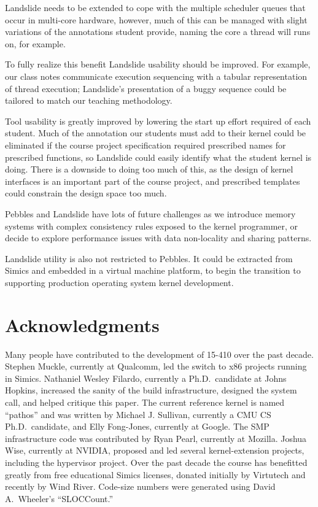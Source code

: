 Landslide needs to be extended to cope with the multiple scheduler queues that occur in multi-core hardware, however, much of this can be managed with slight variations of the annotations student provide, naming the core a thread will runs on, for example.

To fully realize this benefit Landslide usability should be improved.
For example, our class notes communicate execution sequencing with a tabular representation of thread execution; Landslide's presentation of a buggy sequence could be tailored to match our teaching methodology.

Tool usability is greatly improved by lowering the start up effort required of each student.
Much of the annotation our students must add to their kernel could be eliminated if the course project specification required prescribed names for prescribed functions, so Landslide could easily identify what the student kernel is doing.
There is a downside to doing too much of this, as the design of kernel interfaces is an important part of the course project, and prescribed templates could constrain the design space too much.

Pebbles and Landslide have lots of future challenges as we introduce memory systems with complex consistency rules exposed to the kernel programmer, or decide to explore performance issues with data non-locality and sharing patterns.

Landslide utility is also not restricted to Pebbles.
It could be extracted from Simics and embedded in a virtual machine platform, to begin the transition to supporting production operating system kernel development.


\section*{Acknowledgments}

Many people have contributed to the development of
15-410 over the past decade.
Stephen Muckle, currently at Qualcomm, led
the switch to x86 projects running in Simics.
Nathaniel Wesley Filardo,
currently a Ph.D.\ candidate at Johns Hopkins,
increased the sanity of the build infrastructure,
designed the  system call, and helped critique this paper.
The current reference kernel is named ``pathos''
and was written by Michael J. Sullivan,
currently a CMU CS Ph.D.\ candidate,
and Elly Fong-Jones, currently at Google.
The SMP infrastructure code was contributed by
Ryan Pearl, currently at Mozilla.
Joshua Wise, currently at NVIDIA,
proposed and led several kernel-extension projects,
including the hypervisor project.
Over the past decade the course has benefitted
greatly from free educational Simics licenses,
donated initially by Virtutech and recently by
Wind River.
Code-size numbers were generated using David A.\ Wheeler's
``SLOCCount.''

